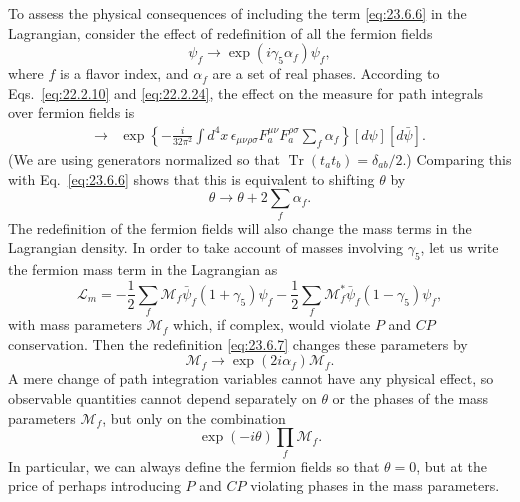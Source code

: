 To assess the physical consequences of including the term
\eqref{eq:23.6.6} in the Lagrangian, consider the effect of redefinition
of all the fermion fields
\begin{equation}
\psi_f\longrightarrow\exp(i\gamma_5\alpha_f)\psi_f,
\tag{23.6.7}\label{eq:23.6.7}
\end{equation}
where $f$ is a flavor index, and $\alpha_f$ are a set of real phases.
According to Eqs.~\eqref{eq:22.2.10} and \eqref{eq:22.2.24}, the effect
on the measure for path integrals over fermion fields is
\begin{align}
[d\psi][d\bar\psi]\longrightarrow{}&
\exp\left\{-\frac{i}{32\pi^2}\int d^4x\,
\epsilon_{\mu\nu\rho\sigma}F_a^{\mu\nu}F_a^{\rho\sigma}
\sum_f\alpha_f\right\}
[d\psi][d\bar\psi].
\tag{23.6.8}\label{eq:23.6.8}
\end{align}
(We are using generators normalized so that
$\operatorname{Tr}(t_a t_b)=\delta_{ab}/2$.)
Comparing this with Eq.~\eqref{eq:23.6.6} shows that this is equivalent
to shifting $\theta$ by
\begin{equation}
\theta\longrightarrow\theta+2\sum_f\alpha_f.
\tag{23.6.9}\label{eq:23.6.9}
\end{equation}
The redefinition of the fermion fields will also change the mass terms in
the Lagrangian density. In order to take account of masses involving
$\gamma_5$, let us write the fermion mass term in the Lagrangian as
\begin{equation}
\mathcal L_m=-\frac12\sum_f\mathcal M_f\bar\psi_f(1+\gamma_5)\psi_f
-\frac12\sum_f\mathcal M_f^*\bar\psi_f(1-\gamma_5)\psi_f,
\tag{23.6.10}\label{eq:23.6.10}
\end{equation}
with mass parameters $\mathcal M_f$ which, if complex, would violate
$P$ and $CP$ conservation. Then the redefinition \eqref{eq:23.6.7}
changes these parameters by
\begin{equation}
\mathcal M_f\longrightarrow\exp(2i\alpha_f)\mathcal M_f.
\tag{23.6.11}\label{eq:23.6.11}
\end{equation}
A mere change of path integration variables cannot have any physical
effect, so observable quantities cannot depend separately on $\theta$ or
the phases of the mass parameters $\mathcal M_f$, but only on the
combination
\begin{equation}
\exp(-i\theta)\prod_f\mathcal M_f.
\tag{23.6.12}\label{eq:23.6.12}
\end{equation}
In particular, we can always define the fermion fields so that $\theta=0$,
but at the price of perhaps introducing $P$ and $CP$ violating phases in
the mass parameters.


